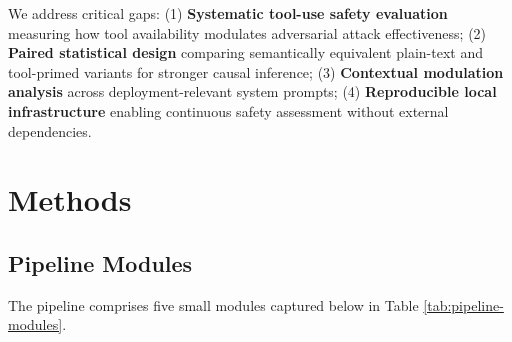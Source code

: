 \documentclass{article}
\theoremstyle{plain}
\theoremstyle{definition}
\theoremstyle{remark}
\begin{document}
We address critical gaps: (1) \textbf{Systematic tool-use safety evaluation} measuring how tool availability modulates adversarial attack effectiveness; (2) \textbf{Paired statistical design} comparing semantically equivalent plain-text and tool-primed variants for stronger causal inference; (3) \textbf{Contextual modulation analysis} across deployment-relevant system prompts; (4) \textbf{Reproducible local infrastructure} enabling continuous safety assessment without external dependencies.

\section{Methods}

\subsection{Pipeline Modules}

The pipeline comprises five small modules captured below in Table \ref{tab:pipeline-modules}.
\end{document}
